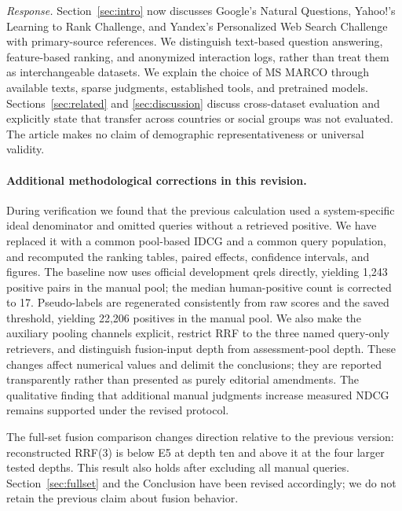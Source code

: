 \emph{Response.} Section~\ref{sec:intro} now discusses Google's Natural Questions, Yahoo!'s Learning to Rank Challenge, and Yandex's Personalized Web Search Challenge with primary-source references. We distinguish text-based question answering, feature-based ranking, and anonymized interaction logs, rather than treat them as interchangeable datasets. We explain the choice of MS MARCO through available texts, sparse judgments, established tools, and pretrained models. Sections~\ref{sec:related} and \ref{sec:discussion} discuss cross-dataset evaluation and explicitly state that transfer across countries or social groups was not evaluated. The article makes no claim of demographic representativeness or universal validity.

\paragraph{Additional methodological corrections in this revision.}
During verification we found that the previous calculation used a system-specific ideal denominator and omitted queries without a retrieved positive. We have replaced it with a common pool-based IDCG and a common query population, and recomputed the ranking tables, paired effects, confidence intervals, and figures. The baseline now uses official development qrels directly, yielding 1,243 positive pairs in the manual pool; the median human-positive count is corrected to 17. Pseudo-labels are regenerated consistently from raw scores and the saved threshold, yielding 22,206 positives in the manual pool. We also make the auxiliary pooling channels explicit, restrict RRF to the three named query-only retrievers, and distinguish fusion-input depth from assessment-pool depth. These changes affect numerical values and delimit the conclusions; they are reported transparently rather than presented as purely editorial amendments. The qualitative finding that additional manual judgments increase measured NDCG remains supported under the revised protocol.

The full-set fusion comparison changes direction relative to the previous version: reconstructed RRF(3) is below E5 at depth ten and above it at the four larger tested depths. This result also holds after excluding all manual queries. Section~\ref{sec:fullset} and the Conclusion have been revised accordingly; we do not retain the previous claim about fusion behavior.
